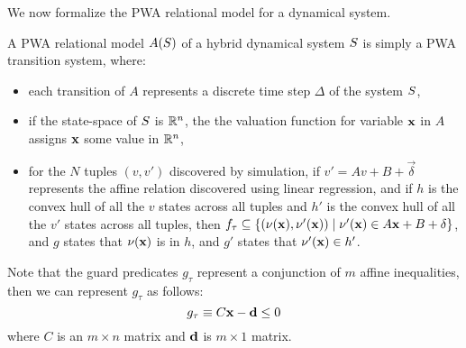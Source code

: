 We now formalize the PWA relational model for a dynamical system.
\begin{definition}

A PWA relational model $A(S)$ of a hybrid dynamical system
$S$ is simply a PWA transition system, where:

\begin{itemize}[noitemsep, leftmargin= 1.5 em]
\item
each transition of $A$ represents a discrete time step $\Delta$ of the
system $S$,
\item
if the state-space of $S$ is $\mathbb{R}^n$, the the valuation
function for variable $\mathbf{x}$ in $A$ assigns $\mathbf{x}$ some value in
$\mathbb{R}^n$,
\item
for the $N$ tuples $(v,v')$ discovered by simulation, if $v' = Av
+ B + \vec{\delta}$ represents the affine relation discovered using
linear regression, and if $h$ is the convex hull of all the $v$
states across all tuples and $h'$ is the convex hull of all the $v'$
states across all tuples, then $f_\tau \subseteq
\{(\nu(\mathbf{x}),\nu'(\mathbf{x})) \mid \nu'(\mathbf{x}) \in A\mathbf{x} + B + \mathbf{\delta}\}$,
and $g$ states that $\nu(\mathbf{x})$ is in $h$, and $g'$ states that
$\nu'(\mathbf{x}) \in h'$.
\end{itemize}

Note that the guard predicates $g_\tau$ represent a conjunction of $m$
affine inequalities, then we can represent $g_\tau$ as follows:
\[
g_\tau  \equiv C\mathbf{x} - \mathbf{d} \le 0
\]
where $C$ is an $m \times n$ matrix and $\mathbf{d}$ is $m \times 1$ matrix.


% 
\end{definition}

